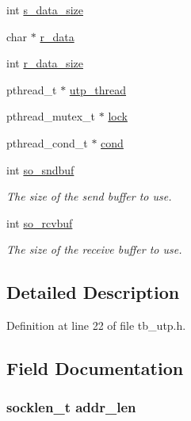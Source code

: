 \begin{DoxyCompactItemize}
\item 
int \hyperlink{structtb__utp__t_a9572e5f95cdcd648c1973020b5f4a25b}{s\-\_\-data\-\_\-size}
\item 
char $\ast$ \hyperlink{structtb__utp__t_a4298ec565665ee4e72e4b28434546602}{r\-\_\-data}
\item 
int \hyperlink{structtb__utp__t_a53fb5c97e533c0555ca3ed99facdb1d5}{r\-\_\-data\-\_\-size}
\item 
pthread\-\_\-t $\ast$ \hyperlink{structtb__utp__t_aa0eb12bac5ef0d83e6689f3b547b695d}{utp\-\_\-thread}
\item 
pthread\-\_\-mutex\-\_\-t $\ast$ \hyperlink{structtb__utp__t_a33586b4184d23f2b8f4df153ec23af13}{lock}
\item 
pthread\-\_\-cond\-\_\-t $\ast$ \hyperlink{structtb__utp__t_a41d4de1455ed50839baec9be13941163}{cond}
\item 
int \hyperlink{structtb__utp__t_aae962af134e15f29f1dd0b005fc3ff2c}{so\-\_\-sndbuf}
\begin{DoxyCompactList}\small\item\em The size of the send buffer to use. \end{DoxyCompactList}\item 
int \hyperlink{structtb__utp__t_a739481faef9852a57d912b2a31b5a8fc}{so\-\_\-rcvbuf}
\begin{DoxyCompactList}\small\item\em The size of the receive buffer to use. \end{DoxyCompactList}\end{DoxyCompactItemize}


\subsection{Detailed Description}


Definition at line 22 of file tb\-\_\-utp.\-h.



\subsection{Field Documentation}
\hypertarget{structtb__utp__t_a116941d922ae354d7241d04b0f3c84d8}{
\subsubsection[{addr\-\_\-len}]{\setlength{\rightskip}{0pt plus 5cm}socklen\-\_\-t addr\-\_\-len}}\label{structtb__utp__t_a116941d922ae354d7241d04b0f3c84d8}


